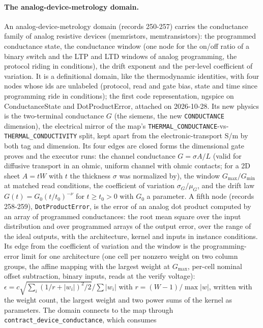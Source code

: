 \documentclass[11pt,a4paper]{article}
\begin{document}
\paragraph{The analog-device-metrology domain.} An analog-device-metrology domain
(records 250-257) carries the conductance family of analog resistive devices
(memristors, memtransistors): the programmed conductance state, the conductance
window (one node for the on/off ratio of a binary switch and the LTP and LTD
windows of analog programming, the protocol riding in conditions), the drift
exponent and the per-level coefficient of variation. It is a definitional domain,
like the thermodynamic identities, with four nodes whose ids are unlabeled
(protocol, read and gate bias, state and time since programming ride in
conditions); the first code representation, ngspice on ConductanceState and
DotProductError, attached on 2026-10-28. Its new
physics is the two-terminal conductance $G$ (the siemens, the new
\texttt{CONDUCTANCE} dimension), the electrical mirror of the map's
\texttt{THERMAL\_CONDUCTANCE}-vs-\texttt{THERMAL\_CONDUCTIVITY} split, kept apart
from the electronic-transport S/m by both tag and dimension. Its four edges are
closed forms the dimensional gate proves and the executor runs: the channel
conductance $G = \sigma A / L$ (valid for diffusive transport in an ohmic, uniform
channel with ohmic contacts; for a 2D sheet $A = tW$ with $t$ the thickness
$\sigma$ was normalized by), the window $G_\mathrm{max}/G_\mathrm{min}$ at
matched read conditions, the coefficient of variation $\sigma_G/\mu_G$, and the
drift law $G(t) = G_0 (t/t_0)^{-\nu}$ for $t \ge t_0 > 0$ with $G_0$ a parameter.
A fifth node (records 258-259), \texttt{DotProductError}, is the error of an
analog dot product computed by an array of programmed conductances: the root mean
square over the input distribution and over programmed arrays of the output error,
over the range of the ideal outputs, with the architecture, kernel and inputs in
instance conditions. Its edge from the coefficient of variation and the window is
the programming-error limit for one architecture (one cell per nonzero weight on
two column groups, the affine mapping with the largest weight at $G_\mathrm{max}$,
per-cell nominal offset subtraction, binary inputs, reads at the verify voltage):
$\epsilon = c \sqrt{\sum_i (1/r + |w_i|)^2 / 2} / \sum |w_i|$ with
$r = (W - 1)/\max|w|$, written with the weight count, the largest weight and two power sums of the
kernel as parameters. The domain
connects to the map through \texttt{contract\_device\_conductance}, which consumes
\end{document}
